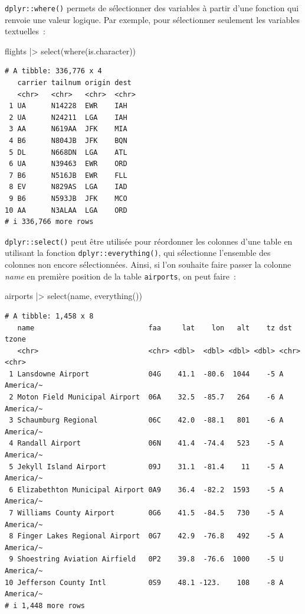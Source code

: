 \documentclass[
  letterpaper,
  DIV=11,
  numbers=noendperiod,
  oneside]{scrreprt}
\newenvironment{Shaded}{\begin{snugshade}}{\end{snugshade}}
\newcommand{\FunctionTok}[1]{\textcolor[rgb]{0.28,0.35,0.67}{#1}}
\newcommand{\NormalTok}[1]{\textcolor[rgb]{0.00,0.23,0.31}{#1}}
\newcommand{\SpecialCharTok}[1]{\textcolor[rgb]{0.37,0.37,0.37}{#1}}
\begin{document}
\texttt{dplyr::where()} permets de sélectionner des variables à partir
d'une fonction qui renvoie une valeur logique. Par exemple, pour
sélectionner seulement les variables textuelles~:

\begin{Shaded}
\begin{Highlighting}[]
\NormalTok{flights }\SpecialCharTok{|\textgreater{}} 
  \FunctionTok{select}\NormalTok{(}\FunctionTok{where}\NormalTok{(is.character))}
\end{Highlighting}
\end{Shaded}

\begin{verbatim}
# A tibble: 336,776 x 4
   carrier tailnum origin dest 
   <chr>   <chr>   <chr>  <chr>
 1 UA      N14228  EWR    IAH  
 2 UA      N24211  LGA    IAH  
 3 AA      N619AA  JFK    MIA  
 4 B6      N804JB  JFK    BQN  
 5 DL      N668DN  LGA    ATL  
 6 UA      N39463  EWR    ORD  
 7 B6      N516JB  EWR    FLL  
 8 EV      N829AS  LGA    IAD  
 9 B6      N593JB  JFK    MCO  
10 AA      N3ALAA  LGA    ORD  
# i 336,766 more rows
\end{verbatim}

\texttt{dplyr::select()} peut être utilisée pour réordonner les colonnes
d'une table en utilisant la fonction \texttt{dplyr::everything()}, qui
sélectionne l'ensemble des colonnes non encore sélectionnées. Ainsi, si
l'on souhaite faire passer la colonne \emph{name} en première position
de la table \texttt{airports}, on peut faire~:

\begin{Shaded}
\begin{Highlighting}[]
\NormalTok{airports }\SpecialCharTok{|\textgreater{}} 
  \FunctionTok{select}\NormalTok{(name, }\FunctionTok{everything}\NormalTok{())}
\end{Highlighting}
\end{Shaded}

\begin{verbatim}
# A tibble: 1,458 x 8
   name                           faa     lat    lon   alt    tz dst   tzone    
   <chr>                          <chr> <dbl>  <dbl> <dbl> <dbl> <chr> <chr>    
 1 Lansdowne Airport              04G    41.1  -80.6  1044    -5 A     America/~
 2 Moton Field Municipal Airport  06A    32.5  -85.7   264    -6 A     America/~
 3 Schaumburg Regional            06C    42.0  -88.1   801    -6 A     America/~
 4 Randall Airport                06N    41.4  -74.4   523    -5 A     America/~
 5 Jekyll Island Airport          09J    31.1  -81.4    11    -5 A     America/~
 6 Elizabethton Municipal Airport 0A9    36.4  -82.2  1593    -5 A     America/~
 7 Williams County Airport        0G6    41.5  -84.5   730    -5 A     America/~
 8 Finger Lakes Regional Airport  0G7    42.9  -76.8   492    -5 A     America/~
 9 Shoestring Aviation Airfield   0P2    39.8  -76.6  1000    -5 U     America/~
10 Jefferson County Intl          0S9    48.1 -123.    108    -8 A     America/~
# i 1,448 more rows
\end{verbatim}
\end{document}

